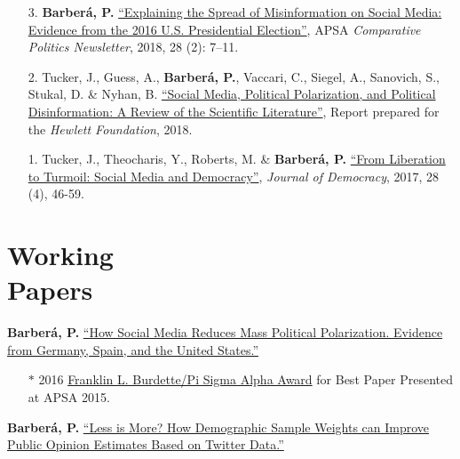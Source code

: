 \documentclass[margin,line,11pt]{resume}
\begin{document}
\begin{resume}
\begin{itemize}[leftmargin=5.5mm]
\item[3.]  \textbf{Barber\'{a}, P.} \href{http://comparativenewsletter.com/files/archived_newsletters/2018_fall.pdf}{``Explaining the Spread of Misinformation on Social Media: Evidence from the 2016 U.S. Presidential Election''}, APSA \textit{Comparative Politics Newsletter}, 2018, 28 (2): 7--11.

\item[2.]  Tucker, J., Guess, A., \textbf{Barber\'{a}, P.}, Vaccari, C., Siegel, A., Sanovich, S., Stukal, D. \& Nyhan, B. \href{https://www.hewlett.org/library/social-media-political-polarization-political-disinformation-review-scientific-literature/}{``Social Media, Political Polarization, and Political Disinformation: A Review of the Scientific Literature''}, Report prepared for the \textit{Hewlett Foundation}, 2018.   

\item[1.]  Tucker, J., Theocharis, Y., Roberts, M. \& \textbf{Barber\'{a}, P.} \href{https://muse.jhu.edu/article/671987/pdf}{``From Liberation to Turmoil: Social Media and Democracy''}, \textit{Journal of Democracy}, 2017, 28 (4), 46-59.   
\end{itemize}     
    
    \section{\mysidestyle Working\\Papers} 

\textbf{Barber\'{a}, P.} \href{http://www.pablobarbera.com/static/barbera_polarization_APSA.pdf}{``How Social Media Reduces Mass Political Polarization. Evidence from Germany, Spain, and the United States.''} 
\begin{itemize}
\item[] $\ast$ 2016 \href{http://www.apsanet.org/PROGRAMS/APSA-Awards/Franklin-L-Burdette-Pi-Sigma-Alpha-Award}{Franklin L. Burdette/Pi Sigma Alpha Award} for Best Paper Presented at APSA 2015.
\end{itemize}  

\textbf{Barber\'{a}, P.} \href{http://pablobarbera.com/static/less-is-more.pdf}{``Less is More? How Demographic Sample Weights can Improve Public Opinion Estimates Based on Twitter Data.''}







\end{resume}
\end{document}
